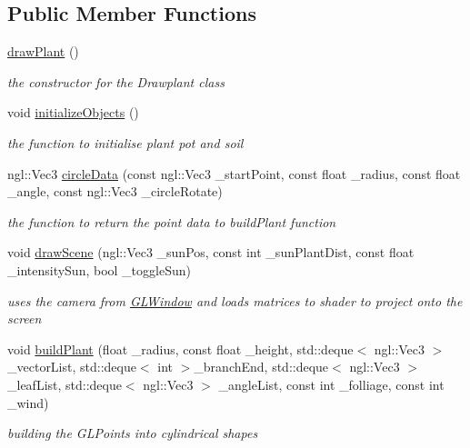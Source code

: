 \subsection*{Public Member Functions}
\begin{DoxyCompactItemize}
\item 
\hyperlink{classdrawPlant_a463d6595d05cfbf83f0f0f4550cde659}{drawPlant} ()
\begin{DoxyCompactList}\small\item\em the constructor for the Drawplant class \item\end{DoxyCompactList}\item 
void \hyperlink{classdrawPlant_ad3334e617ca49c38e033f08ecd7d4421}{initializeObjects} ()
\begin{DoxyCompactList}\small\item\em the function to initialise plant pot and soil \item\end{DoxyCompactList}\item 
ngl::Vec3 \hyperlink{classdrawPlant_a02b5db3e0bf7b2ace07f8a3a36c893b6}{circleData} (const ngl::Vec3 \_\-startPoint, const float \_\-radius, const float \_\-angle, const ngl::Vec3 \_\-circleRotate)
\begin{DoxyCompactList}\small\item\em the function to return the point data to buildPlant function \item\end{DoxyCompactList}\item 
void \hyperlink{classdrawPlant_a937ee4c2cd0961f36a21b9896dc01abf}{drawScene} (ngl::Vec3 \_\-sunPos, const int \_\-sunPlantDist, const float \_\-intensitySun, bool \_\-toggleSun)
\begin{DoxyCompactList}\small\item\em uses the camera from \hyperlink{classGLWindow}{GLWindow} and loads matrices to shader to project onto the screen \item\end{DoxyCompactList}\item 
void \hyperlink{classdrawPlant_a037a68037dc91313242a1a9a33622d76}{buildPlant} (float \_\-radius, const float \_\-height, std::deque$<$ ngl::Vec3 $>$ \_\-vectorList, std::deque$<$ int $>$\_\-branchEnd, std::deque$<$ ngl::Vec3 $>$ \_\-leafList, std::deque$<$ ngl::Vec3 $>$ \_\-angleList, const int \_\-folliage, const int \_\-wind)
\begin{DoxyCompactList}\small\item\em building the GLPoints into cylindrical shapes \item\end{DoxyCompactList}\item 

\end{DoxyCompactItemize}
